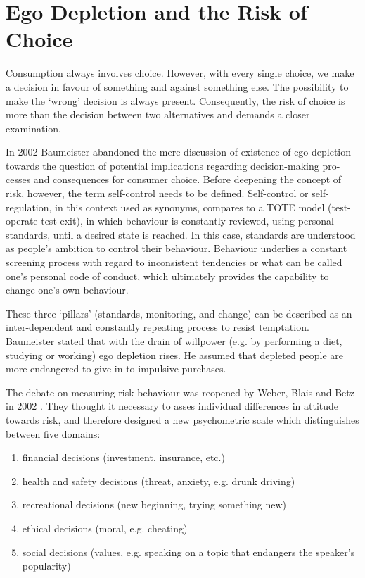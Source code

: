 \section{Ego Depletion and the Risk of Choice}\label{sec:2.2}
Consumption always involves choice. However, with every single choice, we make a decision in favour of something and against something else. The possibility to make the ‘wrong’ decision is always present. Consequently, the risk of choice is more than the decision between two alternatives and demands a closer examination.\par
In 2002 Baumeister \citep{baumeister2002yielding} abandoned the mere discussion of existence of ego depletion towards the question of potential implications regarding decision-making pro-cesses and consequences for consumer choice. Before deepening the concept of risk, however, the term self-control needs to be defined. Self-control or self-regulation, in this context used as synonyms, compares to a TOTE model (test-operate-test-exit), in which behaviour is constantly reviewed, using personal standards, until a desired state is reached. In this case, standards are understood as people’s ambition to control their behaviour. Behaviour underlies a constant screening process with regard to inconsistent tendencies or what can be called one’s personal code of conduct, which ultimately provides the capability to change one’s own behaviour.\par
These three ‘pillars’ (standards, monitoring, and change) can be described as an inter-dependent and constantly repeating process to resist temptation. Baumeister stated that with the drain of willpower (e.g. by performing a diet, studying or working) ego depletion rises. He assumed that depleted people are more endangered to give in to impulsive purchases. \par
The debate on measuring risk behaviour was reopened by Weber, Blais and Betz in 2002 \citep{weber2002domain}. They thought it necessary to asses individual differences in attitude towards risk, and therefore designed a new psychometric scale which distinguishes between five domains: 
\begin{enumerate}
	\item financial decisions (investment, insurance, etc.)
	\item health and safety decisions (threat, anxiety, e.g. drunk driving)
	\item recreational decisions (new beginning, trying something new)
	\item ethical decisions (moral, e.g. cheating) 
	\item social decisions (values, e.g. speaking on a topic that endangers the speaker's popularity)
\end{enumerate}\
